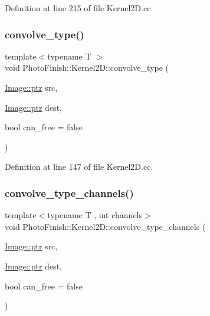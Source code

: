 Definition at line 215 of file Kernel2\+D.\+cc.

\mbox{\label{class_photo_finish_1_1_kernel2_d_ad3480df55b7e5ef7e3cd49d9c30d9ca3}} 
\subsubsection{\texorpdfstring{convolve\+\_\+type()}{convolve\_type()}}
{\footnotesize\ttfamily template$<$typename T $>$ \\
void Photo\+Finish\+::\+Kernel2\+D\+::convolve\+\_\+type (\begin{DoxyParamCaption}\item[{\hyperlink{class_photo_finish_1_1_image_ab336203305ed3a1397d7245063353b5a}{Image\+::ptr}}]{src,  }\item[{\hyperlink{class_photo_finish_1_1_image_ab336203305ed3a1397d7245063353b5a}{Image\+::ptr}}]{dest,  }\item[{bool}]{can\+\_\+free = {\ttfamily false} }\end{DoxyParamCaption})\hspace{0.3cm}{\ttfamily [protected]}}



Definition at line 147 of file Kernel2\+D.\+cc.

\mbox{\label{class_photo_finish_1_1_kernel2_d_abc243c488ecf5d4c435a6ff3e668286b}} 
\subsubsection{\texorpdfstring{convolve\+\_\+type\+\_\+channels()}{convolve\_type\_channels()}}
{\footnotesize\ttfamily template$<$typename T , int channels$>$ \\
void Photo\+Finish\+::\+Kernel2\+D\+::convolve\+\_\+type\+\_\+channels (\begin{DoxyParamCaption}\item[{\hyperlink{class_photo_finish_1_1_image_ab336203305ed3a1397d7245063353b5a}{Image\+::ptr}}]{src,  }\item[{\hyperlink{class_photo_finish_1_1_image_ab336203305ed3a1397d7245063353b5a}{Image\+::ptr}}]{dest,  }\item[{bool}]{can\+\_\+free = {\ttfamily false} }\end{DoxyParamCaption})\hspace{0.3cm}{\ttfamily [protected]}}




